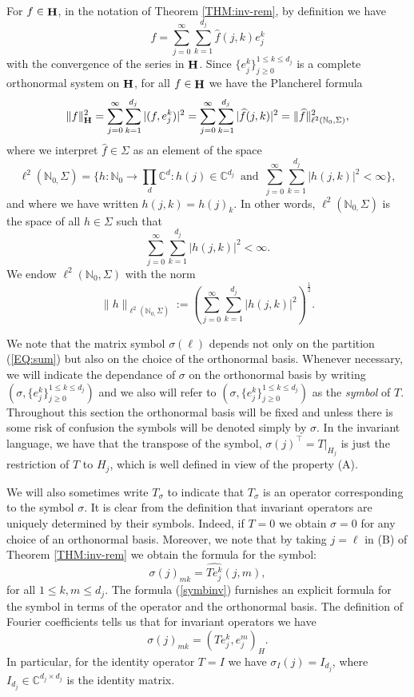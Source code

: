 \documentclass[a4paper,12pt,reqno]{amsart}
\renewcommand\eqref[1]{(\ref{#1})} %
\theoremstyle{definition}
\theoremstyle{remark}
\numberwithin{equation}{section}
\newcommand{\half}{\frac{1}{2}}
\newcommand{\ene}{\mathbb{N}}
\newcommand{\ce}{\mathbb{C}}
\newcommand{\beq}{\begin{equation}}
\newcommand{\eq}{\end{equation}}
\def\N{{{\mathbb N}}}
\def\C{{{\mathbb C}}}
\DeclareMathOperator{\Hcal}{\bf H}
\begin{document}
For $f\in\Hcal$, in the notation of Theorem \ref{THM:inv-rem},
by definition we have
\begin{equation}\label{EQ:ser}
f=\sum_{j=0}^{\infty} \sum_{k=1}^{d_{j}} \widehat{f}(j,k) e_{j}^{k}
\end{equation}
with the convergence of the series in $\Hcal$.
Since $\{e^k_j\}_{j\geq 0}^{1\leq k\leq d_j}$ is a complete orthonormal 
system on  $\Hcal$, for all $f\in \Hcal$ we have the Plancherel formula
\beq \label{EQ:Plancherel}
\|f\|^2_{\Hcal}=\sum\limits_{j=0}^{\infty}\sum\limits_{k=1}^{d_j}|( f,e_j^k)|^2
=  \sum\limits_{j=0}^{\infty}\sum\limits_{k=1}^{d_j}|\widehat{f}(j,k)|^{2}
=\|\widehat{f}\|^{2}_{\ell^2(\N_{0},\Sigma)},
\eq
where we interpret $\widehat{f}\in\Sigma$ as an element of the space
\begin{equation}\label{EQ:aux3}
\ell^2(\N_{0,}\Sigma)=
\{h:\ene_0\rightarrow \prod\limits_d\ce^{d}: h(j)\in \ce^{d_j}\, \mbox{ and }\,\sum\limits_{j=0}^{\infty}\sum\limits_{k=1}^{d_j}|h(j,k)|^2<\infty\}, 
\end{equation}
and where we have written $h(j,k)=h(j)_k$. 
In other words, $\ell^2(\N_{0,}\Sigma)$ is the space of all $h\in\Sigma$ such that
$$
\sum\limits_{j=0}^{\infty}\sum\limits_{k=1}^{d_j}|h(j,k)|^2<\infty.
$$
We endow  $\ell^2(\N_{0},\Sigma)$ with the norm
\begin{equation}\label{EQ:aux4}
\|h\|_{\ell^2(\N_{0,}\Sigma)}:=\left(\sum\limits_{j=0}^{\infty}\sum\limits_{k=1}^{d_j}|h(j,k)|^2\right)^{\half}.
\end{equation}

We note that the matrix symbol $\sigma(\ell)$ depends 
not only on the partition \eqref{EQ:sum} but also
on the choice of the orthonormal basis.
Whenever necessary, we will indicate the dependance of $\sigma$ on the orthonormal 
basis by writing $(\sigma,\{e_j^k\}_{j\geq 0}^{1\leq k\leq d_j} )$ and we also will refer to 
$(\sigma,\{e_j^k\}_{j\geq 0}^{1\leq k\leq d_j} )$ as the {\em symbol} of $T$. 
Throughout this  section the orthonormal basis will be fixed and unless there is some 
risk of confusion the symbols will be denoted simply by $\sigma$.  
In the invariant language,  
we have that the transpose of the symbol,
$\sigma(j)^{\top}=T|_{H_{j}}$ is just the restriction of
$T$ to $H_{j}$, which is well defined in view of the property (A).

We will also sometimes 
write $T_{\sigma}$ to indicate that $T_{\sigma}$ is an operator corresponding to the 
symbol $\sigma $. It is clear from the definition that invariant operators are 
uniquely determined by their symbols. Indeed, if $T=0$ we obtain 
$\sigma=0$  for any choice of an orthonormal basis.  
Moreover, we note that by taking $j=\ell$ in (B) of Theorem \ref{THM:inv-rem} we obtain
the formula for the symbol:
\beq\label{symbinv}
\sigma(j)_{mk}=\widehat{Te_j^k}(j,m),
\eq
for all $1\leq k,m\leq d_j$. The formula (\ref{symbinv}) furnishes 
an explicit formula for the symbol in terms of the operator and the orthonormal basis. 
The definition of Fourier coefficients tells us that for invariant operators
we have 
\beq\label{symbinv2}
\sigma(j)_{mk}=({Te_j^k},e_j^m)_{H}.
\eq
In particular,  for the identity operator $T=I$ we have $\sigma_{I}(j)=I_{d_{j}}$,
where $I_{d_{j}}\in \C^{{d_{j}}\times {d_{j}}}$ is the identity matrix.
\end{document}

